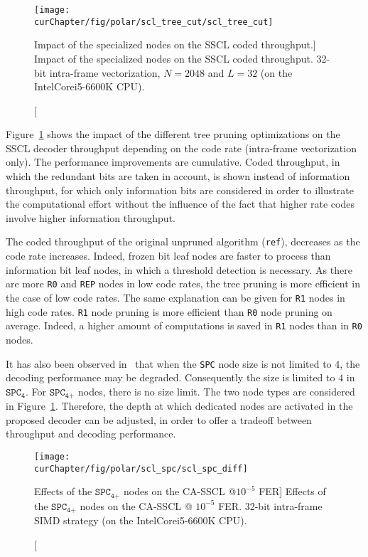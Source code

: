 \begin{figure}[htp]
  \centering
  \texttt{[image: \\curChapter/fig/polar/scl\_tree\_cut/scl\_tree\_cut]}
  \caption
    [Impact of the specialized nodes on the SSCL coded throughput.]
    {Impact of the specialized nodes on the SSCL coded throughput.
    32-bit intra-frame vectorization, $N=2048$ and $L=32$
    (on the Intel\R Core\TM i5-6600K CPU).}
  \label{plot:opt_polar_scl_tree_cut}
\end{figure}

Figure~\ref{plot:opt_polar_scl_tree_cut} shows the impact of the different tree
pruning optimizations on the SSCL decoder throughput depending on the code
rate (intra-frame vectorization only). The performance improvements are
cumulative. Coded throughput, in which the redundant bits are taken in account,
is shown instead of information throughput, for which only information bits are
considered in order to illustrate the computational effort without the influence
of the fact that higher rate codes involve higher information throughput.

The coded throughput of the original unpruned algorithm (\verb|ref|), decreases
as the code rate increases. Indeed, frozen bit leaf nodes are faster to process
than information bit leaf nodes, in which a threshold detection is necessary. As
there are more \verb|R0| and \verb|REP| nodes in low code rates, the tree
pruning is more efficient in the case of low code rates. The same explanation
can be given for \verb|R1| nodes in high code rates. \verb|R1| node pruning is
more efficient than \verb|R0| node pruning on average. Indeed, a higher amount
of computations is saved in \verb|R1| nodes than in \verb|R0| nodes.

It has also been observed in~\cite{Sarkis2016} that when the \verb|SPC| node
size is not limited to $4$, the decoding performance may be degraded.
Consequently the size is limited to $4$ in $\texttt{SPC}_\texttt{4}$. For
$\texttt{SPC}_\texttt{4+}$ nodes, there is no size limit. The two node types are
considered in Figure~\ref{plot:opt_polar_scl_tree_cut}. Therefore, the depth at
which dedicated nodes are activated in the proposed decoder can be adjusted, in
order to offer a tradeoff between throughput and decoding performance.

\begin{figure}[htp]
  \centering
  \texttt{[image: \\curChapter/fig/polar/scl\_spc/scl\_spc\_diff]}
  \caption
    [Effects of the $\texttt{SPC}_\texttt{4+}$ nodes on the CA-SSCL @$10^{-5}$
     FER]
    {Effects of the $\texttt{SPC}_\texttt{4+}$ nodes on the CA-SSCL @ $10^{-5}$
     FER. 32-bit intra-frame SIMD strategy (on the Intel\R Core\TM i5-6600K
     CPU).}
  \label{plot:opt_polar_scl_spc}
\end{figure}

